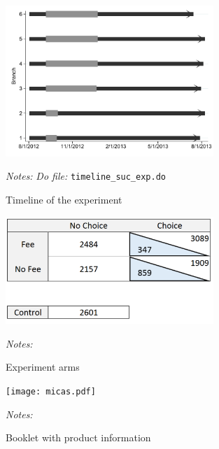 \documentclass[11pt]{article}
\begin{document}
\begin{figure}[H]
        \caption{Timeline of the experiment}
    \label{timeline}
    \begin{center}
        \centering
        \includegraphics[width=0.70\textwidth]{Figuras/timeline_suc_exp_extended.pdf}
    \end{center}
     \footnotesize \textit{Notes: } 
      \footnotesize{ \textit{Do file: }  \texttt{timeline\_suc\_exp.do}}
\end{figure}


\begin{figure}[H]
        \caption{Experiment arms}
    \label{exp_arms}
    \begin{center}
        \centering
        \includegraphics[width=0.70\textwidth]{Figuras/exp_arms.pdf}
    \end{center}
     \footnotesize \textit{Notes: } 
      \footnotesize{ }
\end{figure}


\begin{figure}[H]
        \caption{Booklet with product information}
    \label{micas}
    \begin{center}
        \centering
        \texttt{[image: micas.pdf]}
    \end{center}
     \footnotesize \textit{Notes: } 
      \footnotesize{ }
\end{figure}
\end{document}
